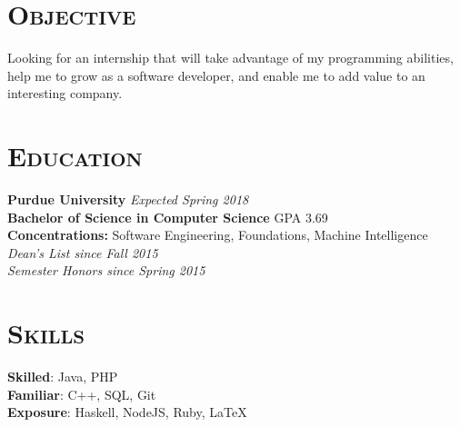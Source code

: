
\hypersetup{backref,pdfpagemode=Full,colorlinks=true,backref}

\addtolength{\oddsidemargin}{-0.45in}
\addtolength{\voffset}{-0.20in}
\addtolength{\textwidth}{0.85in}
\addtolength{\textheight}{1.00in}

\renewcommand{\namefont}{\LARGE\emph}




\address{ryndvs96@gmail.com \ \ \ \ \ github.com/ryndvs96}
\begin{resume}


\section{\textsc{Objective}}

Looking for an internship that will take advantage of my programming abilities, help me to grow as a software developer, and enable me to add value to an interesting company.


\section{\textsc{Education}}

\textbf{Purdue University} \hfill \emph{Expected Spring 2018} \\
\textbf{Bachelor of Science in Computer Science} \hfill GPA 3.69\\
\textbf{Concentrations:} Software Engineering, Foundations, Machine Intelligence\\
\emph{Dean's List since Fall 2015}\\
\emph{Semester Honors since Spring 2015}



\section{\textsc{Skills}}

\small{\textbf{Skilled}: }\normalsize{Java, PHP}\\
\small{\textbf{Familiar}: }\normalsize{C++, SQL, Git}\\
\small{\textbf{Exposure}: }\normalsize{Haskell, NodeJS, Ruby, \LaTeX}


\end{resume}
